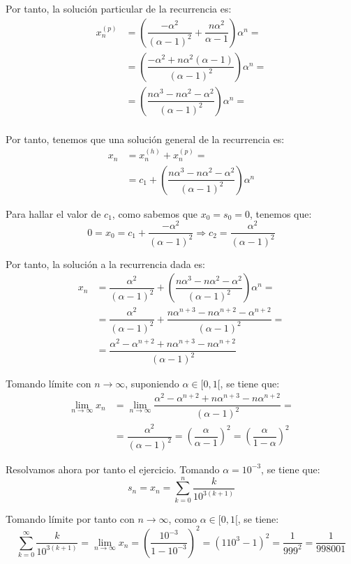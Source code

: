 \begin{ejercicio}
    Por tanto, la solución particular de la recurrencia es:
    \begin{align*}
        x_n^{(p)} &= \left(\dfrac{-\alpha^2}{(\alpha-1)^2} + \dfrac{n\alpha^2}{\alpha-1}\right)\alpha^n =\\
        &= \left(\dfrac{-\alpha^2+n\alpha^2(\alpha-1)}{(\alpha-1)^2}\right)\alpha^n =\\
        &= \left(\dfrac{n\alpha^3-n\alpha^2-\alpha^2}{(\alpha-1)^2}\right)\alpha^n =\\
    \end{align*}

    Por tanto, tenemos que una solución general de la recurrencia es:
    \begin{align*}
        x_n &= x_n^{(h)} + x_n^{(p)} =\\
        &= c_1 + \left(\dfrac{n\alpha^3-n\alpha^2-\alpha^2}{(\alpha-1)^2}\right)\alpha^n
    \end{align*}

    Para hallar el valor de $c_1$, como sabemos que $x_0=s_0=0$, tenemos que:
    \begin{equation*}
        0 = x_0 = c_1 + \dfrac{-\alpha^2}{(\alpha-1)^2} \Longrightarrow c_2=\dfrac{\alpha^2}{(\alpha-1)^2}
    \end{equation*}

    Por tanto, la solución a la recurrencia dada es:
    \begin{align*}
        x_n &= \dfrac{\alpha^2}{(\alpha-1)^2}+ \left(\dfrac{n\alpha^3-n\alpha^2-\alpha^2}{(\alpha-1)^2}\right)\alpha^n =\\
        &= \dfrac{\alpha^2}{(\alpha-1)^2}+ \dfrac{n\alpha^{n+3}-n\alpha^{n+2}-\alpha^{n+2}}{(\alpha-1)^2} =\\
        &= \dfrac{\alpha^2 -\alpha^{n+2} + n\alpha^{n+3}-n\alpha^{n+2}}{(\alpha-1)^2}
    \end{align*}

    Tomando límite con $n\to \infty$, suponiendo $\alpha\in [0,1[$, se tiene que:
    \begin{align*}
        \lim_{n\to \infty} x_n &= \lim_{n\to \infty} \dfrac{\alpha^2 -\alpha^{n+2} + n\alpha^{n+3}-n\alpha^{n+2}}{(\alpha-1)^2}=\\
        &= \dfrac{\alpha^2}{(\alpha-1)^2}=\left(\dfrac{\alpha}{\alpha-1}\right)^2
        = \left(\dfrac{\alpha}{1-\alpha}\right)^2
    \end{align*}

    Resolvamos ahora por tanto el ejercicio. Tomando $\alpha=10^{-3}$, se tiene que:
    \begin{equation*}
        s_n = x_n = \sum_{k=0}^{n} \dfrac{k}{10^{3(k+1)}}
    \end{equation*}

    Tomando límite por tanto con $n\to \infty$, como $\alpha\in [0,1[$, se tiene:
    \begin{equation*}
        \sum_{k=0}^{\infty} \dfrac{k}{10^{3(k+1)}} = \lim_{n\to \infty} x_n
        = \left(\dfrac{10^{-3}}{1-10^{-3}}\right)^2
        = \left({1}{10^3-1}\right)^2
        = \dfrac{1}{999^2} = \dfrac{1}{998001}
    \end{equation*}
\end{ejercicio}



